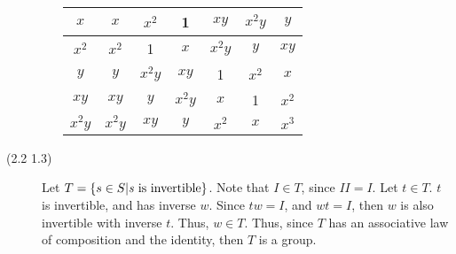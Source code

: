 \begin{description}
\begin{itemize}
\begin{tabular}{| c || c | c | c | c | c | c |}
\hline
$x$ & $x$ & $x^2$ & 1 & $xy$ & $x^2y$ & $y$ \\
\hline
$x^2$ & $x^2$ & 1 & $x$ & $x^2y$ & $y$ & $xy$ \\
\hline
$y$ & $y$ & $x^2y$ & $xy$ & 1 & $x^2$ & $x$ \\
\hline
$xy$ & $xy$ & $y$ & $x^2y$ & $x$ & 1 & $x^2$ \\
\hline
$x^2y$ & $x^2y$ & $xy$ & $y$ & $x^2$ & $x$ & $x^3$ \\
\hline
\end{tabular}
\end{itemize}
%
%
%
%
%
%
%
%
\item[(2.2 {\color{cBlue}1.3})]
Let $T = \left\lbrace s \in S | \text{\emph{s} is invertible} \right\rbrace$. Note that $I \in T$, since $II = I$. Let $t \in T$. $t$ is invertible, and has inverse $w$. Since $tw = I$, and $wt = I$, then $w$ is also invertible with inverse $t$. Thus, $w \in T$. Thus, since $T$ has an associative law of composition and the identity, then $T$ is a group.


\end{description}
